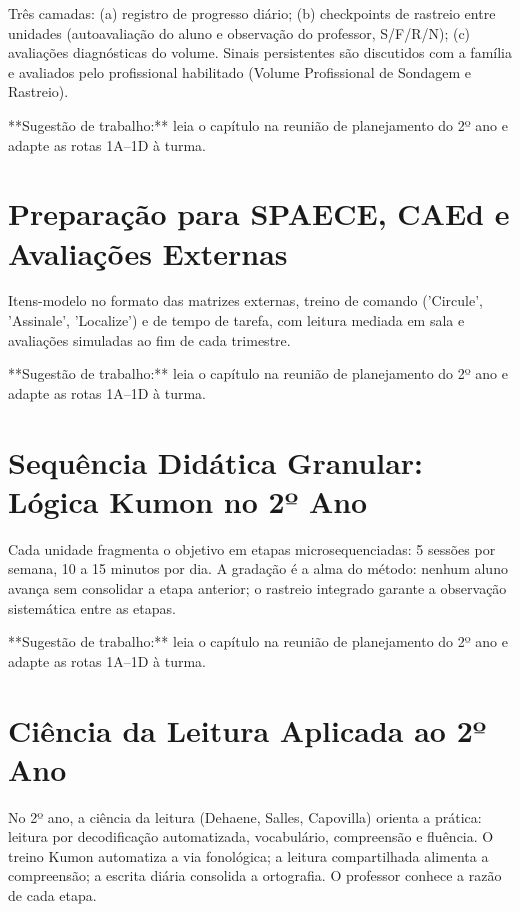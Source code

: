 Três camadas: (a) registro de progresso diário; (b) checkpoints de rastreio entre unidades (autoavaliação do aluno e observação do professor, S/F/R/N); (c) avaliações diagnósticas do volume. Sinais persistentes são discutidos com a família e avaliados pelo profissional habilitado (Volume Profissional de Sondagem e Rastreio).


\begin{dica}
**Sugestão de trabalho:** leia o capítulo na reunião de planejamento do 2º ano e adapte as rotas 1A–1D à turma.
\end{dica}

\chapter{Preparação para SPAECE, CAEd e Avaliações Externas}

Itens-modelo no formato das matrizes externas, treino de comando ('Circule', 'Assinale', 'Localize') e de tempo de tarefa, com leitura mediada em sala e avaliações simuladas ao fim de cada trimestre.


\begin{dica}
**Sugestão de trabalho:** leia o capítulo na reunião de planejamento do 2º ano e adapte as rotas 1A–1D à turma.
\end{dica}

\chapter{Sequência Didática Granular: Lógica Kumon no 2º Ano}

Cada unidade fragmenta o objetivo em etapas microsequenciadas: 5 sessões por semana, 10 a 15 minutos por dia. A gradação é a alma do método: nenhum aluno avança sem consolidar a etapa anterior; o rastreio integrado garante a observação sistemática entre as etapas.


\begin{dica}
**Sugestão de trabalho:** leia o capítulo na reunião de planejamento do 2º ano e adapte as rotas 1A–1D à turma.
\end{dica}

\chapter{Ciência da Leitura Aplicada ao 2º Ano}

No 2º ano, a ciência da leitura (Dehaene, Salles, Capovilla) orienta a prática: leitura por decodificação automatizada, vocabulário, compreensão e fluência. O treino Kumon automatiza a via fonológica; a leitura compartilhada alimenta a compreensão; a escrita diária consolida a ortografia. O professor conhece a razão de cada etapa.


